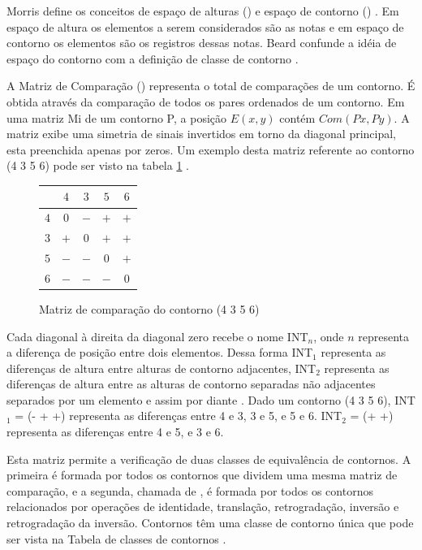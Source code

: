 Morris define os conceitos de espaço de alturas () e
espaço de contorno () \cite{morris87:composition}. Em
espaço de altura os elementos a serem considerados são as notas e em
espaço de contorno os elementos são os registros dessas notas. Beard
confunde a idéia de espaço do contorno com a definição de classe de
contorno \cite[p. 11]{beard03:contour}.

A Matriz de Comparação () representa o total de
comparações de um contorno. É obtida através da comparação de todos os
pares ordenados de um contorno. Em uma matriz Mi de um contorno P, a
posição $E (x,y)$ contém $Com (Px,Py)$. A matriz exibe uma simetria de
sinais invertidos em torno da diagonal principal, esta preenchida
apenas por zeros. Um exemplo desta matriz referente ao contorno (4 3 5
6) pode ser visto na tabela \ref{fig:matriz-4356}
\cite[p. 28]{morris87:composition}.

\begin{figure}
  \centering
  \begin{tabular}{r|cccc}
    & $4$ & $3$ & $5$ & $6$ \\
    \hline
    $4$ & $0$ & $-$ & $+$ & $+$ \\
    $3$ & $+$ & $0$ & $+$ & $+$ \\
    $5$ & $-$ & $-$ & $0$ & $+$ \\
    $6$ & $-$ & $-$ & $-$ & $0$ \\
  \end{tabular}
  \caption{Matriz de comparação do contorno (4 3 5 6)}
  \label{fig:matriz-4356}
\end{figure}

Cada diagonal à direita da diagonal zero recebe o nome INT$_n$, onde
$n$ representa a diferença de posição entre dois elementos. Dessa
forma INT$_1$ representa as diferenças de altura entre alturas de
contorno adjacentes, INT$_2$ representa as diferenças de altura entre
as alturas de contorno separadas não adjacentes separados por um
elemento e assim por diante \cite[p. 231]{marvin.ea87:relating}. Dado
um contorno (4 3 5 6), INT$_1$ = (- + +) representa as diferenças
entre 4 e 3, 3 e 5, e 5 e 6. INT$_2$ = (+ +) representa as diferenças
entre 4 e 5, e 3 e 6.

Esta matriz permite a verificação de duas classes de equivalência de
contornos. A primeira é formada por todos os contornos que dividem uma
mesma matriz de comparação, e a segunda, chamada de , é
formada por todos os contornos relacionados por operações de
identidade, translação, retrogradação, inversão e retrogradação da
inversão. Contornos têm uma classe de contorno única que pode ser
vista na Tabela de classes de contornos \cite{marvin.ea87:relating}.

